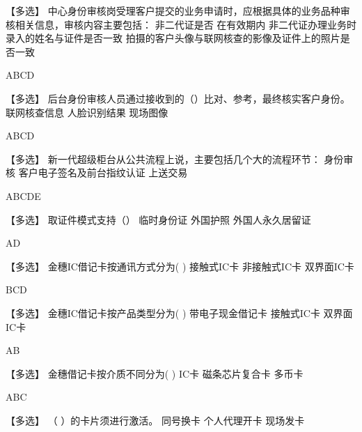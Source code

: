 \documentclass[kindlepaper]{BHCexam4kindle}
\begin{document}
\begin{questions}
\qs 【多选】 中心身份审核岗受理客户提交的业务申请时，应根据具体的业务品种审核相关信息，审核内容主要包括： \xx
{} {  非二代证是否
在有效期内 } { 非二代证办理业务时录入的姓名与证件是否一致 } { 拍摄的客户头像与联网核查的影像及证件上的照片是否一致 }
\begin{solution} ABCD \end{solution}
\qs 【多选】 后台身份审核人员通过接收到的（）比对、参考，最终核实客户身份。 \xx
{} {  联网核查信息 } { 人脸识别结果 } { 现场图像 }
\begin{solution} ABCD \end{solution}
\qs 【多选】 新一代超级柜台从公共流程上说，主要包括几个大的流程环节： \xx
{} {  身份审核 } { 客户电子签名及前台指纹认证 } { 上送交易 }
\begin{solution} ABCDE \end{solution}
\qs 【多选】 取证件模式支持（） \xx
{} {  临时身份证 } { 外国护照 } { 外国人永久居留证 }
\begin{solution} AD \end{solution}
\qs 【多选】 金穗IC借记卡按通讯方式分为(    ) \xx
{} {  接触式IC卡 } { 非接触式IC卡 } { 双界面IC卡 }
\begin{solution} BCD \end{solution}
\qs 【多选】 金穗IC借记卡按产品类型分为(    ) \xx
{} {  带电子现金借记卡 } { 接触式IC卡 } { 双界面IC卡 }
\begin{solution} AB \end{solution}
\qs 【多选】 金穗借记卡按介质不同分为(    ) \xx
{} {  IC卡 } { 磁条芯片复合卡 } { 多币卡 }
\begin{solution} ABC \end{solution}
\qs 【多选】 （    ）的卡片须进行激活。 \xx
{} {  同号换卡 } { 个人代理开卡 } { 现场发卡 }

\end{questions}
\end{document}
